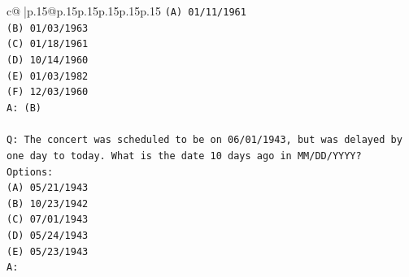 \documentclass{article}
\begin{document}
{\begin{supertabular}{c@{$\;$}|p{.15\linewidth}@{}p{.15\linewidth}p{.15\linewidth}p{.15\linewidth}p{.15\linewidth}p{.15\linewidth}}
{{{\texttt{(A) 01/11/1961} \\
\texttt{(B) 01/03/1963} \\
\texttt{(C) 01/18/1961} \\
\texttt{(D) 10/14/1960} \\
\texttt{(E) 01/03/1982} \\
\texttt{(F) 12/03/1960} \\
\texttt{A: (B)} \\
\\ 
\texttt{Q: The concert was scheduled to be on 06/01/1943, but was delayed by one day to today. What is the date 10 days ago in MM/DD/YYYY?} \\
\texttt{Options:} \\
\texttt{(A) 05/21/1943} \\
\texttt{(B) 10/23/1942} \\
\texttt{(C) 07/01/1943} \\
\texttt{(D) 05/24/1943} \\
\texttt{(E) 05/23/1943} \\
\texttt{A:} \\
            }
        }
    }
     \\ \\


\end{supertabular}}
\end{document}
